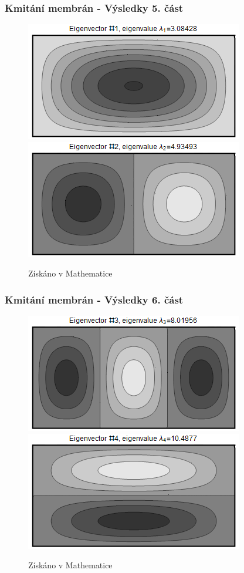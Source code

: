 \documentclass[xcolor=table]{beamer}
\begin{document}
\begin{frame}
\frametitle{Kmitání membrán - Výsledky 5. část}
\centering
\begin{figure}
\includegraphics[width=.6\linewidth]{rectangle-eigenvector-1.png}
\includegraphics[width=.6\linewidth]{rectangle-eigenvector-2.png}
\caption{Získáno v Mathematice}
\end{figure}
\end{frame}

\begin{frame}
\frametitle{Kmitání membrán - Výsledky 6. část}
\centering
\begin{figure}
\includegraphics[width=.6\linewidth]{rectangle-eigenvector-3.png}
\includegraphics[width=.6\linewidth]{rectangle-eigenvector-4.png}
\caption{Získáno v Mathematice}
\end{figure}
\end{frame}
\end{document}
